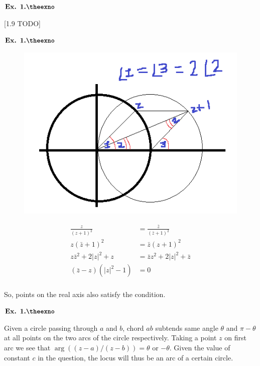 \documentclass{article}
\newcounter{exno}
\begin{document}
\vspace{0.2in}

${\textbf{Ex. 1.\theexno}}$
\addtocounter{exno}{1}

[1.9 TODO]

\vspace{0.2in}

${\textbf{Ex. 1.\theexno}}$
\addtocounter{exno}{1}

\begin{figure}[h!]
    \centering
    \includegraphics[scale=0.85]{1_10}
    \label{1_10}
\end{figure}

\begin{align*}
    \frac{z}{(z+1)^2} &= \frac{\bar{z}}{(\bar{z}+1)^2}\\
    z(\bar{z}+1)^2 &= \bar{z}(z+1)^2\\
    z\bar{z}^2 + 2|z|^2 + z &= \bar{z}z^2 + 2|z|^2 + \bar{z}\\
    (\bar{z}-z)(|z|^2 - 1) &= 0\\
\end{align*}

So, points on the real axis also satisfy the condition.

\vspace{0.2in}

${\textbf{Ex. 1.\theexno}}$
\addtocounter{exno}{1}

Given a circle passing through $a$ and $b$, chord $ab$ subtends same angle $\theta$ and $\pi-\theta$ at all points on the two arcs of the circle respectively. Taking a point $z$ on first arc we see that $\arg((z-a)/(z-b)) = \theta$ or $-\theta$. Given the value of constant $c$ in the question, the locus will thus be an arc of a certain circle.
\end{document}
